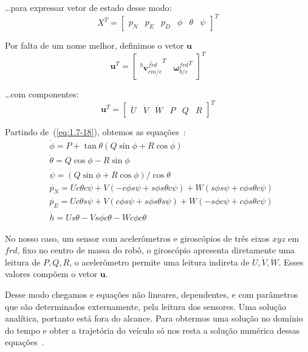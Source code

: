 \ldots para expressar vetor de estado desse modo:
\begin{equation*}
    X^{T} = \begin{bmatrix} p_{N} &  p_{E} & p_{D} & \phi & \theta & \psi \end{bmatrix}^{T}
\end{equation*}

Por falta de um nome melhor, definimos o vetor \(\mathbf{u}\)
\begin{equation*}
    \mathbf{u}^{T} = \begin{bmatrix} {^{b}\dot{{\mathbf{v}}^{frd}_{cm/e}}^{T}} & {\mathbf{\omega}^{frd}_{b/e}}^{T} \end{bmatrix}^{T}
\end{equation*}

\ldots com componentes:
\begin{equation*}
    \mathbf{u}^{T} = \begin{bmatrix} \dot{U} & \dot{V} & \dot{W} & P & Q & R \end{bmatrix}^{T}
\end{equation*}

Partindo de~(\ref{eq:1.7-18}), obtemos as equações~\cite{Stevens2016}:
\begin{align}\label{Tab:2.5-1}
    &\dot{\phi}   =  P + \tan{\theta} \left( Q \sin{\phi} + R \cos{\phi} \right) \\
    &\dot{\theta} =  Q \cos{\phi} - R \sin{\phi} \\
    &\dot{\psi}   =  \left( Q \sin{\phi} + R \cos{\phi} \right) / \cos{\theta} \\
    &\dot{p_{N}}  =  U c \theta c \psi  + V ( -c \phi s \psi + s \phi s \theta c \psi ) + W ( s \phi s \psi + c \phi s \theta c \psi) \\
    &\dot{p_{E}}  =  U c \theta s \psi  + V (  c \phi s \psi + s \phi s \theta s \psi ) + W (-s \phi c \psi + c \phi s \theta c \psi) \\
    &\dot{h}      =  U s \theta - V s \phi c \theta - W c \phi c \theta
\end{align}

No nosso caso, um sensor com acelerômetros e giroscópios de três eixos \(xyz\) em \(frd\), fixo no centro de massa do robô, o giroscópio apresenta diretamente uma leitura de \( P, Q, R\), o acelerômetro permite uma leitura indireta de \( \dot{U}, \dot{V}, \dot{W}\). Esses valores compõem o vetor \(\mathbf{u}\).

Desse modo chegamos e equações não lineares, dependentes, e com parâmetros que são determinados externamente, pela leitura dos sensores. Uma solução analítica, portanto está fora do alcance. Para obtermos uma solução no domínio do tempo e obter a trajetória do veículo só nos resta a solução numérica dessas equações~\cite{Stevens2016}.

